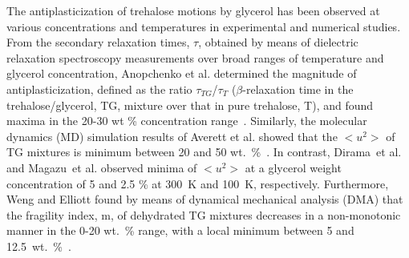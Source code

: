 \documentclass[journal=jpcbfk,manuscript=article]{achemso}
\begin{document}
\begin{singlespacing}
The antiplasticization of trehalose motions by glycerol has been observed at various concentrations 
and temperatures in experimental and numerical studies. 
From the secondary relaxation times, $\tau$, obtained by means of dielectric relaxation spectroscopy 
measurements over broad ranges of temperature and glycerol concentration, Anopchenko et al. determined the 
magnitude of antiplasticization, defined as the ratio $\tau_{TG}$/$\tau_{T}$ ($\beta$-relaxation time in the 
trehalose/glycerol, TG, mixture over that in pure trehalose, T), and found maxima in the 20-30 wt \% concentration 
range~\cite{Anopchenko2006,Obrzut2010}. Similarly, the molecular dynamics (MD) simulation results of 
Averett et al. showed that the $<u^{\textrm{2}}>$ of TG mixtures is minimum between 20 and 50 wt.~\%~\cite{Averett2012}.
In contrast, Dirama~{et al.} and Magazu~{et al.} observed minima of $<u^{\textrm{2}}>$ at a glycerol weight concentration 
of 5 and 2.5 \% at 300~K and 100~K, respectively. Furthermore, Weng and Elliott found by means of 
dynamical mechanical analysis (DMA) that the fragility index, m, of dehydrated TG mixtures decreases 
in a non-monotonic manner in the 0-20 wt.~\% range, with a local minimum between 5 and 12.5~wt.~\%~\cite{Weng2015}.


\end{singlespacing}
\end{document}

